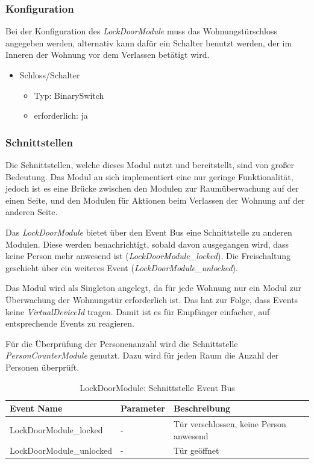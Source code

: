 \subsubsection{Konfiguration}
Bei der Konfiguration des \emph{LockDoorModule} muss das Wohnungstürschloss angegeben werden, alternativ kann dafür ein Schalter benutzt werden, der im Inneren der Wohnung vor dem Verlassen betätigt wird. 
\begin{itemize}
	\item Schloss/Schalter
	\begin{itemize}
		\item Typ: BinarySwitch
		\item erforderlich: ja
	\end{itemize}
\end{itemize}

\subsubsection{Schnittstellen}
Die Schnittstellen, welche dieses Modul nutzt und bereitstellt, sind von großer Bedeutung. Das Modul an sich implementiert eine nur geringe Funktionalität, jedoch ist es eine Brücke zwischen den Modulen zur Raumüberwachung auf der einen Seite, und den Modulen für Aktionen beim Verlassen der Wohnung auf der anderen Seite.

Das \emph{LockDoorModule} bietet über den Event Bus eine Schnittstelle zu anderen Modulen. Diese werden benachrichtigt, sobald davon ausgegangen wird, dass keine Person mehr anwesend ist (\emph{LockDoorModule\_locked}). Die Freischaltung geschieht über ein weiteres Event (\emph{LockDoorModule\_unlocked}).

Das Modul wird als Singleton angelegt, da für jede Wohnung nur ein Modul zur Überwachung der Wohnungstür erforderlich ist. Das hat zur Folge, dass Events keine \emph{VirtualDeviceId} tragen. Damit ist es für Empfänger einfacher, auf entsprechende Events zu reagieren.

Für die Überprüfung der Personenanzahl wird die Schnittstelle \emph{PersonCounterModule} genutzt. Dazu wird für jeden Raum die Anzahl der Personen überprüft.

\begin{table}[h!]
\begin{tabularx}{\textwidth}{
		 >{\hsize=1.25\hsize}X %
		>{\hsize=0.5\hsize\centering}X %
		>{\hsize=1.25\hsize}X %
	}
	\hline
	\textbf{Event Name}					& \textbf{Parameter}	& \textbf{Beschreibung} \\
	\hline LockDoorModule\_locked		& - 					& Tür verschlossen, keine Person anwesend \\ 
	\hline LockDoorModule\_unlocked		& - 			 		& Tür geöffnet \\ 
	\hline
\end{tabularx}
\caption{LockDoorModule: Schnittstelle Event Bus}
\end{table}


